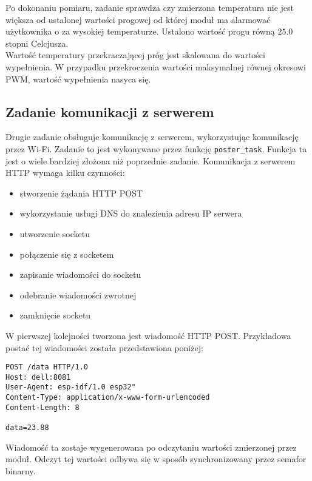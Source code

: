 Po dokonaniu pomiaru, zadanie sprawdza czy zmierzona temperatura nie jest większa od 
ustalonej wartości progowej od której moduł ma alarmować użytkownika o za wysokiej
temperaturze. Ustalono wartość progu równą $\num{25.0}$ stopni Celcjusza.\\

Wartość temperatury przekraczającej próg jest skalowana do wartości wypełnienia.
W przypadku przekroczenia wartości maksymalnej równej okresowi PWM, wartość wypełnienia 
nasyca się.\\

\subsection{Zadanie komunikacji z serwerem}
\label{projekt_poster_task}
Drugie zadanie obsługuje komunikację z serwerem, wykorzystując komunikację przez Wi-Fi.
Zadanie to jest wykonywane przez funkcję \verb+poster_task+. Funkcja ta jest o wiele bardziej
złożona niż poprzednie zadanie. Komunikacja z serwerem HTTP wymaga kilku czynności: \\

\begin{itemize}
    \item stworzenie żądania HTTP POST
    \item wykorzystanie usługi DNS do znalezienia adresu IP serwera
    \item utworzenie socketu
    \item połączenie się z socketem
    \item zapisanie wiadomości do socketu
    \item odebranie wiadomości zwrotnej
    \item zamknięcie socketu
\end{itemize}

W pierwszej kolejności tworzona jest wiadomość HTTP POST. Przykładowa postać tej
wiadomości została przedstawiona poniżej:

\begin{lstlisting}[style=customlatex,
    frame=single,
    caption={Przykładowa postać żądania HTTP POST},
    captionpos=b,
    label={projekt_adc_task}]
POST /data HTTP/1.0
Host: dell:8081
User-Agent: esp-idf/1.0 esp32"
Content-Type: application/x-www-form-urlencoded
Content-Length: 8

data=23.88

\end{lstlisting}

Wiadomość ta zostaje wygenerowana po odczytaniu wartości zmierzonej przez moduł.
Odczyt tej wartości odbywa się w sposób synchronizowany przez semafor binarny.\\


